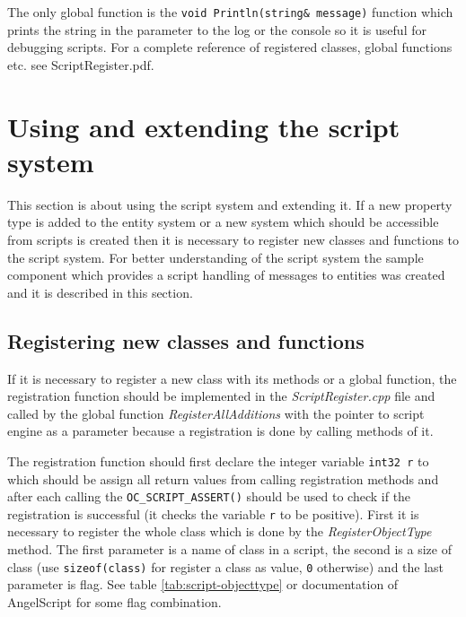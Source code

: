 The only global function is the \verb/void Println(string& message)/ function which prints the string in the parameter to the log or the console so it is useful for debugging scripts. For a complete reference of registered classes, global functions etc. see ScriptRegister.pdf.

\section{Using and extending the script system}

This section is about using the script system and extending it. If a new property type is added to the entity system or a new system which should be accessible from scripts is created then it is necessary to register new classes and functions to the script system. For better understanding of the script system the sample component which provides a script handling of messages to entities was created and it is described in this section.

\subsection{Registering new classes and functions}
\label{sub:script-registering}

If it is necessary to register a new class with its methods or a global function, the registration function should be implemented in the \emph{ScriptRegister.cpp} file and called by the global function \emph{RegisterAllAdditions} with the pointer to script engine as a parameter because a registration is done by calling methods of it.

The registration function should first declare the integer variable \verb/int32 r/ to which should be assign all return values from calling registration methods and after each calling the \verb/OC_SCRIPT_ASSERT()/ should be used to check if the registration is successful (it checks the variable \verb/r/ to be positive). First it is necessary to register the whole class which is done by the \emph{RegisterObjectType} method. The first parameter is a name of class in a script, the second is a size of class (use \verb/sizeof(class)/ for register a class as value, \verb/0/ otherwise) and the last parameter is flag. See table \ref{tab:script-objecttype} or documentation of AngelScript \cite{angelscript} for some flag combination.

